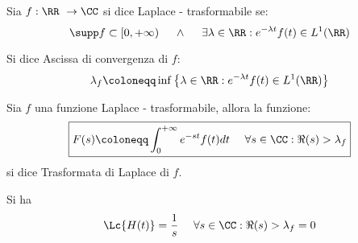 \begin{defn}
Sia $\displaystyle f:\RR \ \rightarrow \CC $ si dice Laplace - trasformabile se:
\begin{equation*}
\supp f\subset [ 0, + \infty) \ \ \ \ \land \ \ \ \ \exists \lambda \in \RR :e^{- \lambda t} f(t) \in L^{1}(\RR)
\end{equation*}
\end{defn}
\begin{defn}
Si dice Ascissa di convergenza di $\displaystyle f$:
\begin{equation*}
\lambda_{f} \coloneqq \inf\left\{\lambda \in \RR :e^{- \lambda t} f(t) \in L^{1}(\RR)\right\}
\end{equation*}
\end{defn}
\begin{defn}
Sia $\displaystyle f$ una funzione Laplace - trasformabile, allora la funzione:
\begin{equation*}
\boxed{F(s) \coloneqq \int^{+ \infty}_{0} e^{- st} f(t) dt\ \ \ \ \forall s\in \CC :\Re (s) > \lambda_{f}}
\end{equation*}
si dice Trasformata di Laplace di $\displaystyle f$.
\end{defn}
\begin{rem}
 Si ha
\begin{equation*}
\Lc\{H(t)\} = \frac{1}{s} \ \ \ \ \forall s\in \CC :\Re (s) > \lambda_{f} = 0
\end{equation*}
\end{rem}
